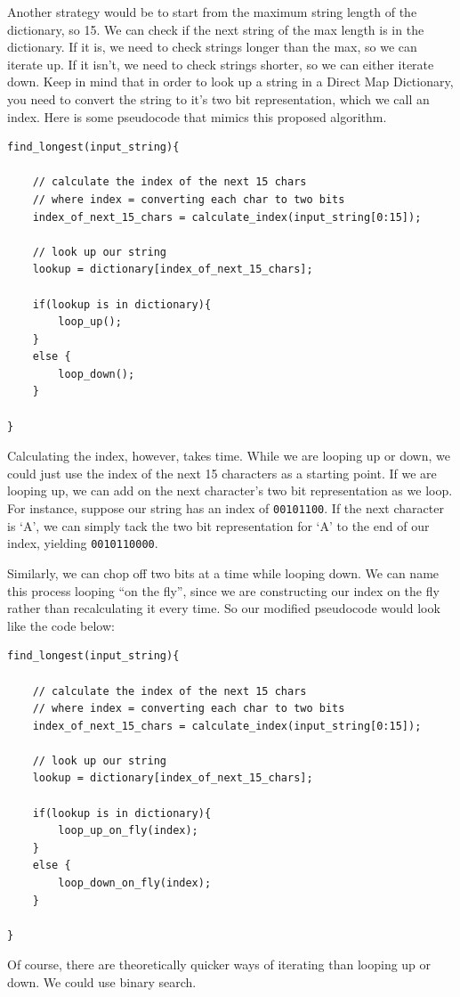 \documentclass[12pt,twoside]{reedthesis}
\begin{document}
Another strategy would be to start from the maximum string length of the dictionary, so 15. We can check if the next string of the max length is in the dictionary. If it is, we need to check strings longer than the max, so we can iterate up. If it isn't, we need to check strings shorter, so we can either iterate down. Keep in mind that in order to look up a string in a Direct Map Dictionary, you need to convert the string to it's two bit representation, which we call an index. Here is some pseudocode that mimics this proposed algorithm.
\begin{verbatim}
find_longest(input_string){

    // calculate the index of the next 15 chars
    // where index = converting each char to two bits
    index_of_next_15_chars = calculate_index(input_string[0:15]);

    // look up our string
    lookup = dictionary[index_of_next_15_chars];

    if(lookup is in dictionary){
        loop_up();
    }
    else {
        loop_down();
    }
    
}
\end{verbatim}
Calculating the index, however, takes time. While we are looping up or down, we could just use the index of the next 15 characters as a starting point. If we are looping up, we can add on the next character's two bit representation as we loop. For instance, suppose our string has an index of \texttt{00101100}. If the next character is `A', we can simply tack the two bit representation for `A' to the end of our index, yielding \texttt{00101100\textbar{}00}.

Similarly, we can chop off two bits at a time while looping down. We can name this process looping ``on the fly'', since we are constructing our index on the fly rather than recalculating it every time. So our modified pseudocode would look like the code below:
\begin{verbatim}
find_longest(input_string){

    // calculate the index of the next 15 chars
    // where index = converting each char to two bits
    index_of_next_15_chars = calculate_index(input_string[0:15]);

    // look up our string
    lookup = dictionary[index_of_next_15_chars];

    if(lookup is in dictionary){
        loop_up_on_fly(index);
    }
    else {
        loop_down_on_fly(index);
    }
    
}
\end{verbatim}
Of course, there are theoretically quicker ways of iterating than looping up or down. We could use binary search.
\end{document}
